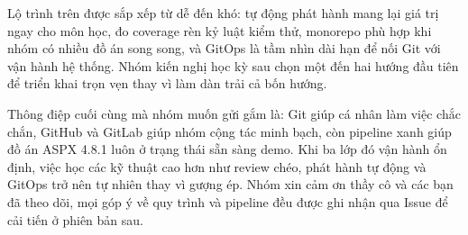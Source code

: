Lộ trình trên được sắp xếp từ dễ đến khó: tự động phát hành mang lại giá trị ngay cho môn học, đo coverage rèn kỷ luật kiểm thử, monorepo phù hợp khi nhóm có nhiều đồ án song song, và GitOps là tầm nhìn dài hạn để nối Git với vận hành hệ thống.
Nhóm kiến nghị học kỳ sau chọn một đến hai hướng đầu tiên để triển khai trọn vẹn thay vì làm dàn trải cả bốn hướng.

Thông điệp cuối cùng mà nhóm muốn gửi gắm là: Git giúp cá nhân làm việc chắc chắn, GitHub và GitLab giúp nhóm cộng tác minh bạch, còn pipeline xanh giúp đồ án ASPX 4.8.1 luôn ở trạng thái sẵn sàng demo.
Khi ba lớp đó vận hành ổn định, việc học các kỹ thuật cao hơn như review chéo, phát hành tự động và GitOps trở nên tự nhiên thay vì gượng ép.
Nhóm xin cảm ơn thầy cô và các bạn đã theo dõi, mọi góp ý về quy trình và pipeline đều được ghi nhận qua Issue để cải tiến ở phiên bản sau.
